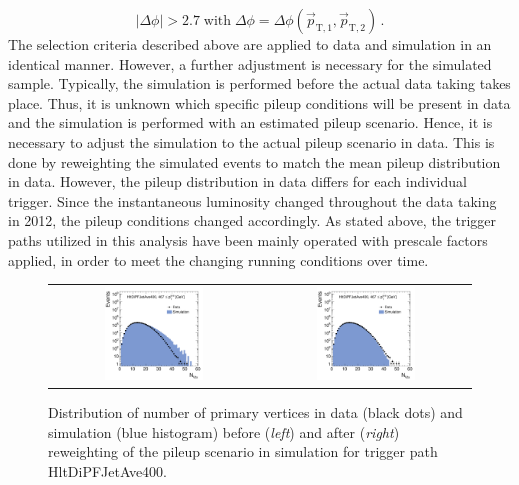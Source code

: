 \begin{equation}
|\Delta \phi| > 2.7 \; \mathrm{with} \; \Delta \phi = \Delta \phi(\vec{p}_\mathrm{T,1}, \vec{p}_\mathrm{T,2}) \, .
\end{equation}  
The selection criteria described above are applied to data and simulation in an identical manner. However, a further adjustment is necessary for the simulated sample. Typically, the simulation is performed before the actual data taking takes place. Thus, it is unknown which specific pileup conditions will be present in data and the simulation is performed with an estimated pileup scenario. Hence, it is necessary to adjust the simulation to the actual pileup scenario in data. This is done by reweighting the simulated events to match the mean pileup distribution in data. However, the pileup distribution in data differs for each individual trigger. Since the instantaneous luminosity changed throughout the data taking in 2012, the pileup conditions changed accordingly. As stated above, the trigger paths utilized in this analysis have been mainly operated with prescale factors applied, in order to meet the changing running conditions over time. 
\begin{figure}[!t]
  \centering
  \begin{tabular}{cc}
                \includegraphics[width=0.49\textwidth]{figures/NVtx_HltDiPFJetAve400_AfterTriggerSelection.pdf} &
                \includegraphics[width=0.49\textwidth]{figures/NVtx_HltDiPFJetAve400_AfterPUReweighting.pdf}
  \end{tabular}
  \caption{Distribution of number of primary vertices in data (black dots) and simulation (blue histogram) before (\textit{left}) and after (\textit{right}) reweighting of the pileup scenario in simulation for trigger path HltDiPFJetAve400.}
  \label{fig:pu_reweight}
\end{figure}
